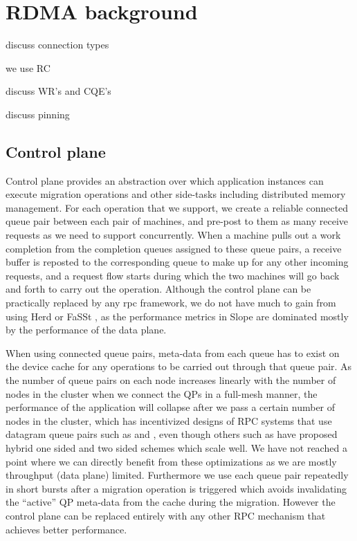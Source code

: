 \section{RDMA background}

discuss connection types

we use RC

discuss WR's and CQE's

discuss pinning


\subsection{Control plane}
Control plane provides an abstraction over which application instances can
execute migration operations and other side-tasks including distributed
memory management. For each operation that we support, we create a reliable
connected queue pair between each pair of machines, and pre-post to them
as many receive requests as we need to support concurrently. When a
machine pulls out a work completion from the completion queues assigned to
these queue pairs, a receive buffer is reposted to the corresponding queue to
make up for any other incoming requests, and a request flow starts during which
the two machines will go back and forth to carry out the operation. Although
the control plane can be practically replaced by any rpc framework, we do not
have much to gain from using Herd \cite{kalia2016designguidelines} or
FaSSt \cite{kalia2016fasst}, as the performance metrics in Slope are dominated mostly
by the performance of the data plane.

When using connected queue pairs, meta-data
from each queue has to exist on the device cache for any operations to be
carried out through that queue pair. As the number of queue pairs on each node
increases linearly with the number of nodes in the cluster when we connect the
QPs in a full-mesh manner, the performance of the application will collapse
after we pass a certain number of nodes in the cluster, which has
incentivized designs of RPC systems that use datagram queue pairs such as
\cite{kalia2019datacenter} and \cite{kalia2016fasst}, even though others such
as \cite{novakovic2019storm} have proposed hybrid one sided and two sided
schemes which scale well. We have not reached a point where we can directly
benefit from these optimizations as we are mostly throughput (data plane)
limited. Furthermore we use each queue pair repeatedly in short bursts after a
migration operation is triggered which avoids invalidating the ``active'' QP
meta-data from the cache during the migration. However the control plane
can be replaced entirely with any other RPC mechanism that achieves better
performance.

